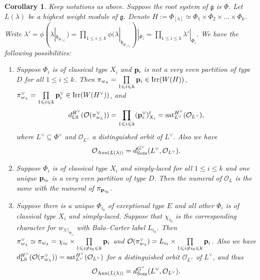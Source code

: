 \documentclass[reqno,12pt]{amsart}
\numberwithin{equation}{section}
\theoremstyle{plain}
\newtheorem{Cor}[Thm]{Corollary}
\theoremstyle{definition}
\newcommand{\lam}{\lambda}
\renewcommand{\subset}{\subseteq}
\newcommand{\lest}{\leqslant}
\begin{document}
\begin{Cor}
    Keep notations as above. Suppose the root system of $\mathfrak{g}$ is $\Phi$. Let $L(\lam)$ be a highest weight module of $\mathfrak{g}$. Denote
$H:=\Phi_{[\lambda]}\simeq \Phi_1 \times \Phi_2 \times ... \times \Phi_k$. Write $\lam'=\phi(\lam|_{\mathfrak{h}_{\Phi_{[\lambda]}}})=\prod\limits_{1\lest i\lest k} \phi(\lambda|_{\mathfrak{h}_{\Phi_{[\lambda]}}})|_{{\Phi_i}}=\prod\limits_{1\lest i\lest k} \lam'|_{{\Phi_i}}$. We have the following possibilities:
\begin{enumerate}
    \item Suppose $\Phi_i$ is of classical type $X_i$ and ${\bf p}_{i}$ is not a  very even partition of type $D$  for all $1\lest i \lest k$.   Then $\pi_{w_{\lam}}=\prod\limits_{1\lest i\lest k}{\bf p}_{i} \in {\rm Irr}(W(H)) $, $\pi^{\vee}_{w_{\lam}}=\prod\limits_{1\lest i\lest k}{\bf p}^{\vee}_{i} \in {\rm Irr}(W(H^{\vee})) $, and 
$$d_{\rm LS}^{H^\vee}(\mathcal{O}(\pi^{\vee}_{w_{\lam}}))=\prod\limits_{1\lest i\lest k}({\bf p}^{\vee}_{i})^t_{X_i} = {\rm sat}_{L^\vee}^{H^\vee} (\mathcal{O}_{L^\vee}),$$
where $L^\vee \subset \Phi^\vee$ and $\mathcal{O}_{L^\vee}$ a distinguished orbit of $L^\vee$.
Also we have
$$\mathcal{O}_{{\rm Ann}(L(\lambda))} = d_{\rm Som}^{G^\vee}(L^{\vee}, \mathcal{O}_{L^\vee}).$$

\item Suppose $\Phi_i$ is of classical type $X_i$ and simply-laced  for all $1\lest i \lest k$ and one unique ${\bf p}_{i_0}$ is  a  very even partition of type $D$. Then the numeral of $\mathcal{O}_L$ is the same with the numeral of $\pi_{{\bf p}_{i_0}}$.


\item Suppose there is a unique $\Phi_{i_0}$ of exceptional type $E$ and all other $\Phi_i$ is of classical type $X_i$ and simply-laced.
Suppose that $\chi_{i_0}$  is the corresponding character for $w_{\lam'|_{{\Phi_{i_0}}}}$ with Bala--Carter label $L_{i_0}$. Then $\pi^{\vee}_{w_{\lam}} \simeq \pi_{w_{\lam}}=\chi_{i_0}\times \prod\limits_{1\lest i\neq i_0\lest k}{\bf p}_{i}$ and $\mathcal{O}(\pi_{w_\lambda}^\vee)=L_{i_0}\times \prod\limits_{1\lest i\neq i_0\lest k}{\bf p}_{i}$. 
Also we have
$d_{\rm LS}^{H^\vee}(\mathcal{O}(\pi_{w_\lambda}^\vee)) = {\rm sat}_{L^\vee}^{H^\vee}(\mathcal{O}_{L^\vee})$ 
for a distinguished orbit $\mathcal{O}_{L^\vee}$ of $L^\vee$, 
and thus 
$$\mathcal{O}_{{\rm Ann}(L(\lambda))} = d_{\rm Som}^{G^\vee}(L^{\vee}, \mathcal{O}_{L^\vee}).$$

\end{enumerate}
\end{Cor}
\end{document}
